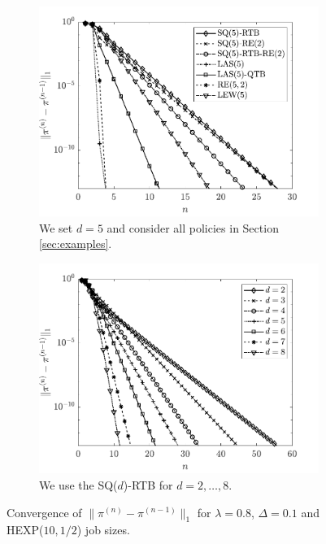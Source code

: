 \documentclass[12pt]{report}
\begin{document}
\begin{figure}[t]
\begin{subfigure}{0.43\textwidth}
\centering
\captionsetup{width=.8\linewidth}
\includegraphics[width=1\linewidth]{figures/Chapter7/fig1a.pdf}
\caption{We set $d=5$ and consider all policies in Section \ref{sec:examples}.}
\label{fig1a}
\end{subfigure}
\begin{subfigure}{.43\textwidth}
\centering
\captionsetup{width=.8\linewidth}
\includegraphics[width=1\linewidth]{figures/Chapter7/fig1b.pdf}
\caption{We use the SQ($d$)-RTB for $d=2,\ldots,8$.}
\label{fig1b}
\end{subfigure}
\caption{Convergence of $\|\pi^{(n)} - \pi^{(n-1)}\|_1$ for $\lambda=0.8$, $\Delta=0.1$ and HEXP($10, 1/2$) job sizes.}
\label{fig1}
\end{figure}
\end{document}
